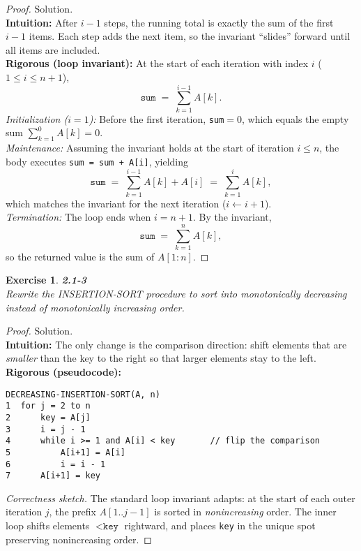 \documentclass[12pt]{article}
\newtheorem{exercise}[theorem]{Exercise}
\theoremstyle{definition}
\begin{document}
\vspace{1pt}

\begin{proof}
Solution.\\

\noindent
\textbf{Intuition:} After $i-1$ steps, the running total is exactly the sum of the first $i-1$ items.
Each step adds the next item, so the invariant “slides” forward until all items are included.\\

\noindent
\textbf{Rigorous (loop invariant):} At the start of each iteration with index $i$ ($1\le i\le n+1$),
\[
\texttt{sum} \;=\; \sum_{k=1}^{i-1} A[k].
\]
\emph{Initialization ($i=1$):} Before the first iteration, \texttt{sum}$=0$, which equals the empty sum
$\sum_{k=1}^{0}A[k]=0$.\\
\emph{Maintenance:} Assuming the invariant holds at the start of iteration $i\le n$,
the body executes \texttt{sum = sum + A[i]}, yielding
\[
\texttt{sum} \;=\; \sum_{k=1}^{i-1}A[k] + A[i] \;=\; \sum_{k=1}^{i}A[k],
\]
which matches the invariant for the next iteration ($i\!\gets\! i+1$).\\
\emph{Termination:} The loop ends when $i=n+1$. By the invariant,
\[
\texttt{sum} \;=\; \sum_{k=1}^{n}A[k],
\]
so the returned value is the sum of $A[1:n]$.
\end{proof}

\newpage

\begin{exercise}
\noindent
\textbf{2.1-3}\\
\noindent
Rewrite the INSERTION-SORT procedure to sort into monotonically decreasing
instead of monotonically increasing order.
\end{exercise}

\vspace{1pt}

\begin{proof}
Solution.\\

\noindent
\textbf{Intuition:} The only change is the comparison direction:
shift elements that are \emph{smaller} than the key to the right so that larger elements stay to the left.\\

\noindent
\textbf{Rigorous (pseudocode):}
\begin{verbatim}
DECREASING-INSERTION-SORT(A, n)
1  for j = 2 to n
2      key = A[j]
3      i = j - 1
4      while i >= 1 and A[i] < key       // flip the comparison
5          A[i+1] = A[i]
6          i = i - 1
7      A[i+1] = key
\end{verbatim}
\emph{Correctness sketch.} The standard loop invariant adapts:
at the start of each outer iteration $j$, the prefix $A[1..j-1]$ is sorted in
\emph{nonincreasing} order. The inner loop shifts elements $<\texttt{key}$ rightward,
and places \texttt{key} in the unique spot preserving nonincreasing order.
\end{proof}
\end{document}
